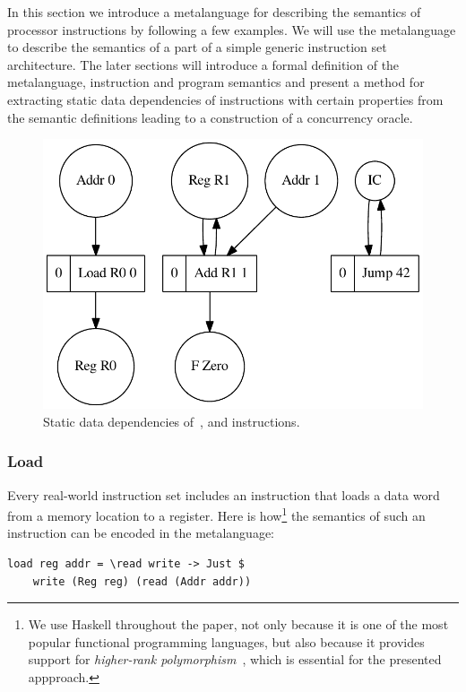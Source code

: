 In this section we introduce a metalanguage for describing the semantics of
processor instructions by following a few examples. We will use the metalanguage
to describe the semantics of a part of a simple generic instruction set
architecture. The later sections will introduce a formal definition of the
metalanguage, instruction and program semantics and present a method for
extracting static data dependencies of instructions with certain properties from
the semantic definitions leading to a construction of a concurrency oracle.

\begin{figure}[H]
\includegraphics[width=35em]{img/loadJumpAdd.pdf}
\caption{Static data dependencies of~,  and
 instructions.}
\end{figure}

\subsubsection{Load} Every real-world instruction set includes an instruction
that loads a data word from a memory location to a register. Here is
how\footnote{We use Haskell throughout the paper, not only because it is one of
the most popular functional programming languages, but also because it provides
support for \emph{higher-rank polymorphism}~\cite{jones2007practical}, which is
essential for the presented appproach.} the semantics of such an instruction can
be encoded in the metalanguage:

\begin{verbatim}
load reg addr = \read write -> Just $
    write (Reg reg) (read (Addr addr))
\end{verbatim}

